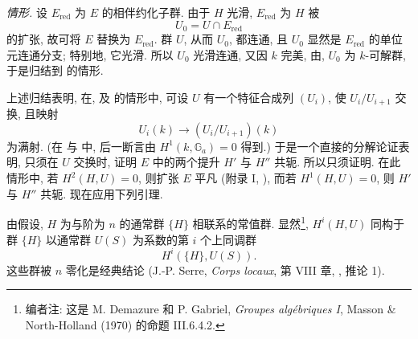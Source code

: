 \medskip\noindent\textit{情形.}\quad
设 \(E_{\mathrm{red}}\) 为 \(E\) 的相伴约化子群.
由于 \(H\) 光滑, \(E_{\mathrm{red}}\) 为 \(H\) 被
\[
  U_0=U\cap E_{\mathrm{red}}
\]
的扩张, 故可将 \(E\) 替换为 \(E_{\mathrm{red}}\).
群 \(U\), 从而 \(U_0\), 都连通,
且 \(U_0\) 显然是 \(E_{\mathrm{red}}\) 的单位元连通分支; 特别地, 它光滑.
所以 \(U_0\) 光滑连通, 又因 \(k\) 完美,
由, \(U_0\) 为 \(k\)-可解群,
于是归结到 的情形.

上述归结表明, 在, 
及 的情形中,
可设 \(U\) 有一个特征合成列 \((U_i)\),
使 \(U_i/U_{i+1}\) 交换, 且映射
\[
  U_i(k)\longrightarrow (U_i/U_{i+1})(k)
\]
为满射. (在
与 中, 后一断言由 \(H^1(k,\mathbb G_a)=0\) 得到.)
于是一个直接的分解论证表明, 只须在 \(U\) 交换时,
证明 \(E\) 中的两个提升 \(H'\) 与 \(H''\) 共轭.
所以只须证明.
在此情形中, 若 \(H^2(H,U)=0\), 则扩张 \(E\) 平凡
(附录 I, ),
而若 \(H^1(H,U)=0\), 则 \(H'\) 与 \(H''\) 共轭.
现在应用下列引理.


由假设, \(H\) 为与阶为 \(n\) 的通常群 \(\{H\}\) 相联系的常值群.
显然\footnote{编者注: 这是 M. Demazure 和 P. Gabriel,
\emph{Groupes algébriques I}, Masson \& North-Holland (1970) 的命题 III.6.4.2.},
\(H^i(H,U)\) 同构于群 \(\{H\}\) 以通常群 \(U(S)\) 为系数的第 \(i\) 个上同调群
\[
  H^i(\{H\},U(S)).
\]
这些群被 \(n\) 零化是经典结论
(J.-P. Serre, \emph{Corps locaux}, 第 VIII 章, , 推论 1).


